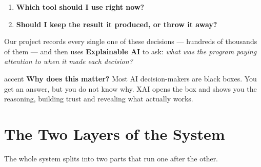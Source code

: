 \documentclass[12pt, a4paper]{article}
\begin{document}
\begin{enumerate}[leftmargin=2cm]
  \item \textbf{Which tool should I use right now?}
  \item \textbf{Should I keep the result it produced, or throw it away?}
\end{enumerate}

Our project records every single one of these decisions ---
hundreds of thousands of them --- and then uses \textbf{Explainable AI}
to ask: \emph{what was the program paying attention to when it made
each decision?}

\begin{simplebox}{accent}
\textbf{Why does this matter?} Most AI decision-makers are black boxes.
You get an answer, but you do not know why. XAI opens the box and shows
you the reasoning, building trust and revealing what actually works.
\end{simplebox}

\section{The Two Layers of the System}

The whole system splits into two parts that run one after the other.

\vspace{0.5cm}

\begin{center}
\end{center}

\vspace{0.3cm}
\end{document}
